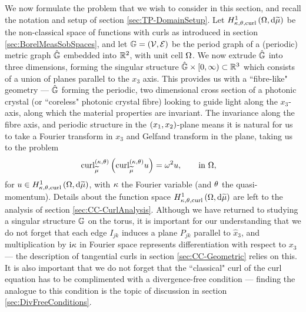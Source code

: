 We now formulate the problem that we wish to consider in this section, and recall the notation and setup of section \ref{sec:TP-DomainSetup}.
Let $H^1_{\kappa,\theta,\mathrm{curl}}\left( \Omega, \mathrm{d}\widetilde{\mu} \right)$ be the non-classical space of functions with curls as introduced in section \ref{sec:BorelMeasSobSpaces}, and let $\mathbb{G}=\left( \mathcal{V},\mathcal{E} \right)$ be the period graph of a (periodic) metric graph $\hat{\mathbb{G}}$ embedded into $\mathbb{R}^2$, with unit cell $\Omega$.
We now extrude $\hat{\mathbb{G}}$ into three dimensions, forming the singular structure $\hat{\mathbb{G}}\times[0,\infty)\subset\mathbb{R}^3$ which consists of a union of planes parallel to the $x_3$ axis.
This provides us with a ``fibre-like" geometry --- $\hat{\mathbb{G}}$ forming the periodic, two dimensional cross section of a photonic crystal (or ``coreless" photonic crystal fibre) looking to guide light along the $x_3$-axis, along which the material properties are invariant.
The invariance along the fibre axis, and periodic structure in the $\left( x_1,x_2 \right)$-plane means it is natural for us to take a Fourier transform in $x_3$ and Gelfand transform in the plane, taking us to the problem
\begin{align} \label{eq:SingularCurlEquation}
	\mathrm{curl}_{\widetilde{\mu}}^{\left( \kappa, \theta \right)}\left(  \mathrm{curl}_{\widetilde{\mu}}^{\left( \kappa, \theta \right)}u  \right) &= \omega^2 u,
	\qquad \text{in } \Omega,
\end{align}
for $u\in H^1_{\kappa,\theta,\mathrm{curl}}\left( \Omega, \mathrm{d}\widetilde{\mu} \right)$, with $\kappa$ the Fourier variable (and $\theta$ the quasi-momentum).
Details about the function space $H^1_{\kappa,\theta,\mathrm{curl}}\left( \Omega, \mathrm{d}\widetilde{\mu} \right)$ are left to the analysis of section \ref{sec:CC-CurlAnalysis}.
Although we have returned to studying a singular structure $\mathbb{G}$ on the torus, it is important for our understanding that we do not forget that each edge $I_{jk}$ induces a plane $P_{jk}$ parallel to $\widehat{x}_3$, and multiplication by $\mathrm{i}\kappa$ in Fourier space represents differentiation with respect to $x_3$ --- the description of tangential curls in section \ref{sec:CC-Geometric} relies on this.
It is also important that we do not forget that the ``classical" curl of the curl equation has to be complimented with a divergence-free condition --- finding the analogue to this condition is the topic of discussion in section \ref{sec:DivFreeConditions}.

